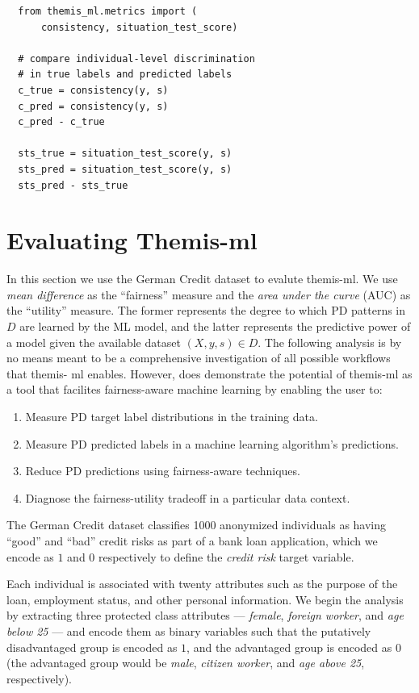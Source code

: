 \documentclass{acm_proc_article-sp}
\begin{document}
\begin{verbatim}
  from themis_ml.metrics import (
      consistency, situation_test_score)

  # compare individual-level discrimination
  # in true labels and predicted labels
  c_true = consistency(y, s)
  c_pred = consistency(y, s)
  c_pred - c_true

  sts_true = situation_test_score(y, s)
  sts_pred = situation_test_score(y, s)
  sts_pred - sts_true
\end{verbatim}

\section{Evaluating Themis-ml}

In this section we use the German Credit dataset \cite{bache2013uci} to evalute
themis-ml. We use \emph{mean difference} as the ``fairness'' measure and the
\emph{area under the curve} (AUC) as the ``utility'' measure. The former
represents the degree to which PD patterns in \(D\) are learned by the ML model,
and the latter represents the predictive power of a model given the available
dataset \((X, y, s) \in D\). The following analysis is by no means meant to be a
comprehensive investigation of all possible workflows that themis- ml enables.
However, does demonstrate the potential of themis-ml as a tool that facilites
fairness-aware machine learning by enabling the user to:

\begin{enumerate}
  \item Measure PD target label distributions in the training data.
  \item Measure PD predicted labels in a machine learning algorithm's predictions.
  \item Reduce PD predictions using fairness-aware techniques.
  \item Diagnose the fairness-utility tradeoff in a particular data context.
\end{enumerate}

The German Credit dataset classifies 1000 anonymized individuals as having
``good'' and ``bad'' credit risks as part of a bank loan application, which we
encode as \(1\) and \(0\) respectively to define the \emph{credit risk}
target variable.

Each individual is associated with twenty attributes such as the purpose of the
loan, employment status, and other personal information. We begin the analysis
by extracting three protected class attributes --- \emph{female},
\emph{foreign worker}, and \emph{age below 25} --- and encode them as binary
variables such that the putatively disadvantaged group is encoded as \(1\), and
the advantaged group is encoded as \(0\) (the advantaged group would be
\emph{male}, \emph{citizen worker}, and \emph{age above 25}, respectively).
\end{document}
